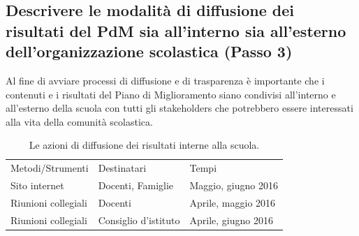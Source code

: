 \documentclass[12pt,a4paper,oneside]{memoir}
\begin{document}
\subsection[Passo 3. Descrivere le modalità di diffusione dei risultati]{Descrivere le modalità di diffusione dei risultati del PdM sia all'interno sia all'esterno dell'organizzazione scolastica (Passo 3)}

Al fine di avviare processi di diffusione e di trasparenza è importante che i contenuti e i risultati del Piano di Miglioramento siano condivisi all'interno e all'esterno della scuola con tutti gli stakeholders che potrebbero essere interessati alla vita della comunità scolastica.\\

\begin{center}
\end{center}

\begin{table}[htp]
\caption{Le azioni di diffusione dei risultati interne alla scuola.} \label{diffusione-risultati-interno}
\footnotesize
\begin{tabular}{|>{\raggedright}p{4.03cm}|>{\raggedright}p{4.03cm}|>{\raggedright\arraybackslash}p{4.03cm}|}
\hline
\rowcolor{violetto}
\multicolumn{3}{|l|}{Strategie di diffusione dei risultati del PdM all'interno della scuola}\\
\hline
\rowcolor{violetto}
Metodi/Strumenti&Destinatari&Tempi\\\hline
Sito internet&Docenti, Famiglie&Maggio, giugno 2016\\\hline
Riunioni collegiali&Docenti&Aprile, maggio  2016\\\hline
Riunioni collegiali&Consiglio d'istituto&Aprile, giugno 2016\\\hline
\end{tabular}
\end{table}
\end{document}
